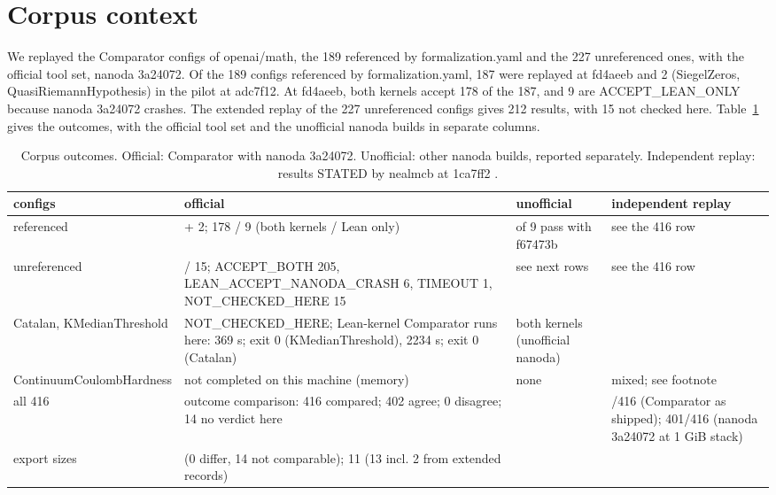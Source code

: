 \section{Corpus context}\label{sec:corpus}

We replayed the Comparator configs of openai/math, the 189 referenced by formalization.yaml and the 227 unreferenced ones, with the official tool set, nanoda 3a24072.
Of the 189 configs referenced by formalization.yaml, 187 were replayed at fd4aeeb and 2 (SiegelZeros, QuasiRiemannHypothesis) in the pilot at adc7f12.
At fd4aeeb, both kernels accept 178 of the 187, and 9 are ACCEPT\_LEAN\_ONLY because nanoda 3a24072 crashes.
The extended replay of the 227 unreferenced configs gives 212 results, with 15 not checked here.
Table~\ref{tab:corpus} gives the outcomes, with the official tool set and the unofficial nanoda builds in separate columns.

\begin{table}[tbp]
\caption{Corpus outcomes. Official: Comparator with nanoda 3a24072. Unofficial: other nanoda builds, reported separately. Independent replay: results STATED by nealmcb at 1ca7ff2 \cite{mcburnett-tooling}.}\label{tab:corpus}
\small
\begin{tabularx}{\textwidth}{@{}>{\raggedright\arraybackslash}p{2.6cm}>{\raggedright\arraybackslash}X>{\raggedright\arraybackslash}p{2.6cm}>{\raggedright\arraybackslash}p{3.0cm}@{}}
\toprule
configs & official & unofficial & independent replay \\
\midrule
189 referenced & 187 + 2; 178 / 9 (both kernels / Lean only) & 9 of 9 pass with f67473b & see the 416 row \\
227 unreferenced & 212 / 15; ACCEPT\_BOTH 205, LEAN\_ACCEPT\_NANODA\_CRASH 6, TIMEOUT 1, NOT\_CHECKED\_HERE 15 & see next rows & see the 416 row \\
Catalan, KMedianThreshold & NOT\_CHECKED\_HERE; Lean-kernel Comparator runs here: 369 s; exit 0 (KMedianThreshold), 2234 s; exit 0 (Catalan) & both kernels (unofficial nanoda) & 10 \\
Continuum\-Coulomb\-Hardness & not completed on this machine (memory) & none & mixed; see footnote \\
all 416 & outcome comparison: 416 compared; 402 agree; 0 disagree; 14 no verdict here & & 416/416 (Comparator as shipped); 401/416 (nanoda 3a24072 at 1 GiB stack) \cite{nanoda-issue-55} \\
export sizes & 146 (0 differ, 14 not comparable); 11 (13 incl. 2 from extended records) & & \\
\bottomrule
\end{tabularx}
\end{table}

